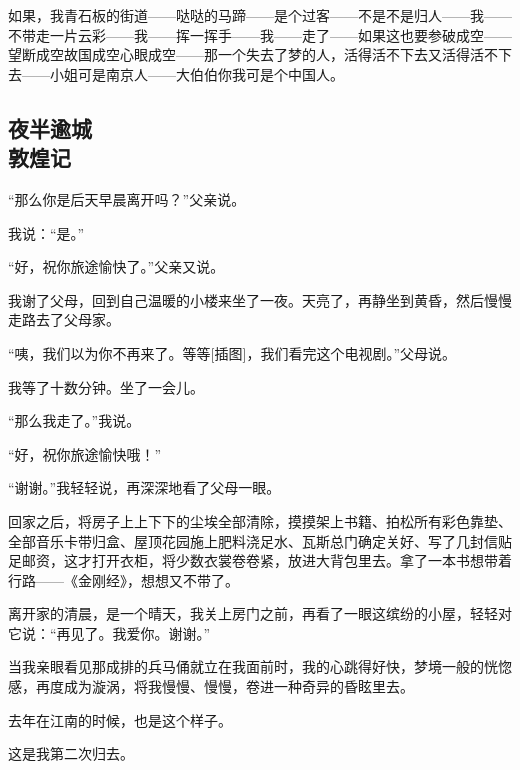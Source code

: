 \par 如果，我青石板的街道——哒哒的马蹄——是个过客——不是不是归人——我——不带走一片云彩——我——挥一挥手——我——走了——如果这也要参破成空——望断成空故国成空心眼成空——那一个失去了梦的人，活得活不下去又活得活不下去——小姐可是南京人——大伯伯你我可是个中国人。


\subsection{夜半逾城\\\small{敦煌记}}


\par “那么你是后天早晨离开吗？”父亲说。
\par 我说：“是。”
\par “好，祝你旅途愉快了。”父亲又说。
\par 我谢了父母，回到自己温暖的小楼来坐了一夜。天亮了，再静坐到黄昏，然后慢慢走路去了父母家。
\par “咦，我们以为你不再来了。等等[插图]，我们看完这个电视剧。”父母说。
\par 我等了十数分钟。坐了一会儿。
\par “那么我走了。”我说。
\par “好，祝你旅途愉快哦！”
\par “谢谢。”我轻轻说，再深深地看了父母一眼。
\par 回家之后，将房子上上下下的尘埃全部清除，摸摸架上书籍、拍松所有彩色靠垫、全部音乐卡带归盒、屋顶花园施上肥料浇足水、瓦斯总门确定关好、写了几封信贴足邮资，这才打开衣柜，将少数衣裳卷卷紧，放进大背包里去。拿了一本书想带着行路——《金刚经》，想想又不带了。
\par 离开家的清晨，是一个晴天，我关上房门之前，再看了一眼这缤纷的小屋，轻轻对它说：“再见了。我爱你。谢谢。”
\par 
\par 当我亲眼看见那成排的兵马俑就立在我面前时，我的心跳得好快，梦境一般的恍惚感，再度成为漩涡，将我慢慢、慢慢，卷进一种奇异的昏眩里去。
\par 去年在江南的时候，也是这个样子。
\par 这是我第二次归去。
\par
